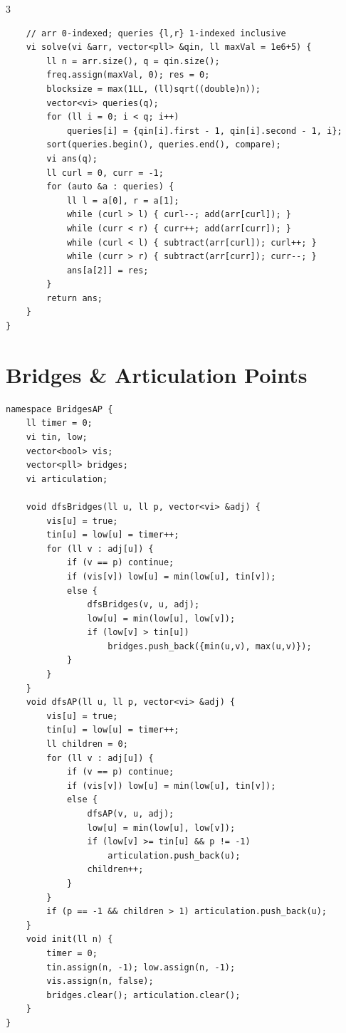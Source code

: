 \documentclass[10pt]{article}
\begin{document}
\begin{multicols*}{3}
\begin{lstlisting}
    // arr 0-indexed; queries {l,r} 1-indexed inclusive
    vi solve(vi &arr, vector<pll> &qin, ll maxVal = 1e6+5) {
        ll n = arr.size(), q = qin.size();
        freq.assign(maxVal, 0); res = 0;
        blocksize = max(1LL, (ll)sqrt((double)n));
        vector<vi> queries(q);
        for (ll i = 0; i < q; i++)
            queries[i] = {qin[i].first - 1, qin[i].second - 1, i};
        sort(queries.begin(), queries.end(), compare);
        vi ans(q);
        ll curl = 0, curr = -1;
        for (auto &a : queries) {
            ll l = a[0], r = a[1];
            while (curl > l) { curl--; add(arr[curl]); }
            while (curr < r) { curr++; add(arr[curr]); }
            while (curl < l) { subtract(arr[curl]); curl++; }
            while (curr > r) { subtract(arr[curr]); curr--; }
            ans[a[2]] = res;
        }
        return ans;
    }
}
\end{lstlisting}

\section{Bridges \& Articulation Points}
\begin{lstlisting}
namespace BridgesAP {
    ll timer = 0;
    vi tin, low;
    vector<bool> vis;
    vector<pll> bridges;
    vi articulation;

    void dfsBridges(ll u, ll p, vector<vi> &adj) {
        vis[u] = true;
        tin[u] = low[u] = timer++;
        for (ll v : adj[u]) {
            if (v == p) continue;
            if (vis[v]) low[u] = min(low[u], tin[v]);
            else {
                dfsBridges(v, u, adj);
                low[u] = min(low[u], low[v]);
                if (low[v] > tin[u])
                    bridges.push_back({min(u,v), max(u,v)});
            }
        }
    }
    void dfsAP(ll u, ll p, vector<vi> &adj) {
        vis[u] = true;
        tin[u] = low[u] = timer++;
        ll children = 0;
        for (ll v : adj[u]) {
            if (v == p) continue;
            if (vis[v]) low[u] = min(low[u], tin[v]);
            else {
                dfsAP(v, u, adj);
                low[u] = min(low[u], low[v]);
                if (low[v] >= tin[u] && p != -1)
                    articulation.push_back(u);
                children++;
            }
        }
        if (p == -1 && children > 1) articulation.push_back(u);
    }
    void init(ll n) {
        timer = 0;
        tin.assign(n, -1); low.assign(n, -1);
        vis.assign(n, false);
        bridges.clear(); articulation.clear();
    }
}
\end{lstlisting}


\end{multicols*}
\end{document}
